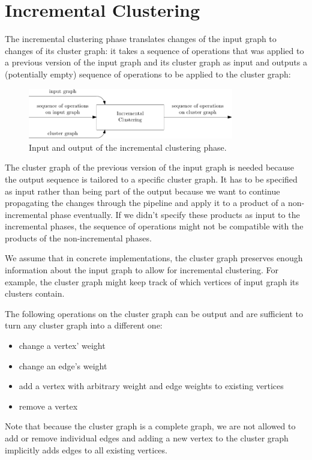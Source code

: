 \section{Incremental Clustering}
\label{sect:incremental-clustering}

The incremental clustering phase translates changes of the input graph to changes of its cluster graph: it takes a sequence of operations that was applied to a previous version of the input graph and its cluster graph as input and outputs a (potentially empty) sequence of operations to be applied to the cluster graph:

\begin{figure}[H]
	\centering\includegraphics[width=0.8\textwidth]{Resources/DynamicPipeline-IncrementalClustering.pdf}
	\caption{Input and output of the incremental clustering phase.}
	\label{fig:dynamic-pipeline-incremental-transformation}
\end{figure}

The cluster graph of the previous version of the input graph is needed because the output sequence is tailored to a specific cluster graph. It has to be specified as input rather than being part of the output because we want to continue propagating the changes through the pipeline and apply it to a product of a non-incremental phase eventually. If we didn't specify these products as input to the incremental phases, the sequence of operations might not be compatible with the products of the non-incremental phases.

We assume that in concrete implementations, the cluster graph preserves enough information about the input graph to allow for incremental clustering. For example, the cluster graph might keep track of which vertices of input graph its clusters contain. 

The following operations on the cluster graph can be output and are sufficient to turn any cluster graph into a different one:
%
\begin{itemize}
	\setlength\itemsep{-0.5em}
	\item change a vertex' weight
	\item change an edge's weight
	\item add a vertex with arbitrary weight and edge weights to existing vertices
	\item remove a vertex
\end{itemize}
%
Note that because the cluster graph is a complete graph, we are not allowed to add or remove individual edges and adding a new vertex to the cluster graph implicitly adds edges to all existing vertices.
